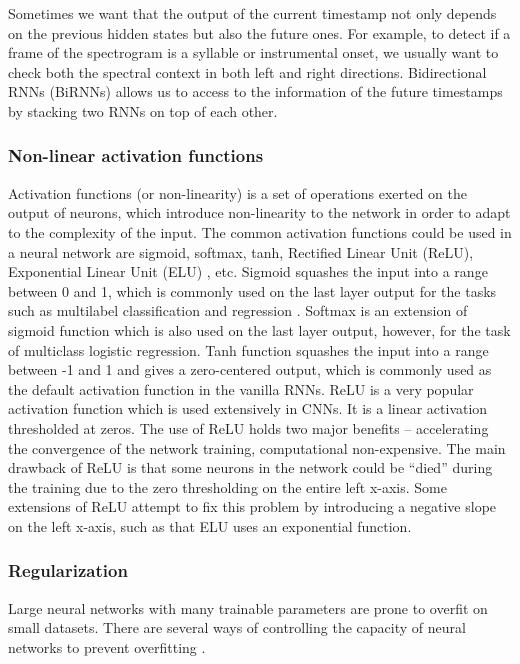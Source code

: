 Sometimes we want that the output of the current timestamp not only depends on the previous hidden states but also the future ones. For example, to detect if a frame of the spectrogram is a syllable or instrumental onset, we usually want to check both the spectral context in both left and right directions. Bidirectional RNNs (BiRNNs) \cite{Schuster1997} allows us to access to the information of the future timestamps by stacking two RNNs on top of each other.

\subsubsection{Non-linear activation functions}

Activation functions (or non-linearity) is a set of operations exerted on the output of neurons, which introduce non-linearity to the network in order to adapt to the complexity of the input. The common activation functions could be used in a neural network are sigmoid, softmax, tanh, Rectified Linear Unit (ReLU), Exponential Linear Unit (ELU) \cite{Clevert2015}, etc. Sigmoid squashes the input into a range between 0 and 1, which is commonly used on the last layer output for the tasks such as multilabel classification and regression \cite{Stanforduniversity}. Softmax is an extension of sigmoid function which is also used on the last layer output, however, for the task of multiclass logistic regression. Tanh function squashes the input into a range between -1 and 1 and gives a zero-centered output, which is commonly used as the default activation function in the vanilla RNNs. ReLU is a very popular activation function which is used extensively in CNNs. It is a linear activation thresholded at zeros. The use of ReLU holds two major benefits -- accelerating the convergence of the network training, computational non-expensive. The main drawback of ReLU is that some neurons in the network could be ``died” during the training due to the zero thresholding on the entire left x-axis. Some extensions of ReLU attempt to fix this problem by introducing a negative slope on the left x-axis, such as that ELU uses an exponential function.

\subsubsection{Regularization}

Large neural networks with many trainable parameters are prone to overfit on small datasets. There are several ways of controlling the capacity of neural networks to prevent overfitting \cite{Stanforduniversity}.

